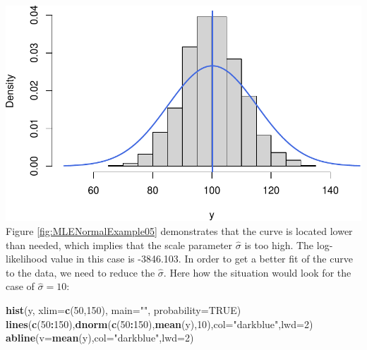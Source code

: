 \documentclass[
]{book}
\newenvironment{Shaded}{\begin{snugshade}}{\end{snugshade}}
\newcommand{\AttributeTok}[1]{\textcolor[rgb]{0.13,0.29,0.53}{#1}}
\newcommand{\ConstantTok}[1]{\textcolor[rgb]{0.56,0.35,0.01}{#1}}
\newcommand{\DecValTok}[1]{\textcolor[rgb]{0.00,0.00,0.81}{#1}}
\newcommand{\FunctionTok}[1]{\textcolor[rgb]{0.13,0.29,0.53}{\textbf{#1}}}
\newcommand{\NormalTok}[1]{#1}
\newcommand{\SpecialCharTok}[1]{\textcolor[rgb]{0.81,0.36,0.00}{\textbf{#1}}}
\newcommand{\StringTok}[1]{\textcolor[rgb]{0.31,0.60,0.02}{#1}}
\theoremstyle{definition}
\theoremstyle{definition}
\theoremstyle{definition}
\theoremstyle{definition}
\theoremstyle{remark}
\begin{document}
\includegraphics{Svetunkov---Statistics-for-Business-Analytics_files/figure-latex/MLENormalExample05-1.pdf}
Figure \ref{fig:MLENormalExample05} demonstrates that the curve is located lower than needed, which implies that the scale parameter \(\hat{\sigma}\) is too high. The log-likelihood value in this case is -3846.103. In order to get a better fit of the curve to the data, we need to reduce the \(\hat{\sigma}\). Here how the situation would look for the case of \(\hat{\sigma}=10\):

\begin{Shaded}
\begin{Highlighting}[]
\FunctionTok{hist}\NormalTok{(y, }\AttributeTok{xlim=}\FunctionTok{c}\NormalTok{(}\DecValTok{50}\NormalTok{,}\DecValTok{150}\NormalTok{), }\AttributeTok{main=}\StringTok{""}\NormalTok{, }\AttributeTok{probability=}\ConstantTok{TRUE}\NormalTok{)}
\FunctionTok{lines}\NormalTok{(}\FunctionTok{c}\NormalTok{(}\DecValTok{50}\SpecialCharTok{:}\DecValTok{150}\NormalTok{),}\FunctionTok{dnorm}\NormalTok{(}\FunctionTok{c}\NormalTok{(}\DecValTok{50}\SpecialCharTok{:}\DecValTok{150}\NormalTok{),}\FunctionTok{mean}\NormalTok{(y),}\DecValTok{10}\NormalTok{),}\AttributeTok{col=}\StringTok{"darkblue"}\NormalTok{,}\AttributeTok{lwd=}\DecValTok{2}\NormalTok{)}
\FunctionTok{abline}\NormalTok{(}\AttributeTok{v=}\FunctionTok{mean}\NormalTok{(y),}\AttributeTok{col=}\StringTok{"darkblue"}\NormalTok{,}\AttributeTok{lwd=}\DecValTok{2}\NormalTok{)}
\end{Highlighting}
\end{Shaded}
\end{document}
